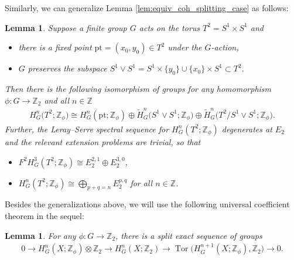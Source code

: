 \documentclass[pdftex]{sigma}
\newtheorem{lem}[thm]{Lemma}
\theoremstyle{definition}
\newcommand{\Z}{\mathbb{Z}}
\newcommand{\pt}{\mathrm{pt}}
\begin{document}
Similarly, we can generalize Lemma \ref{lem:equiv_coh_splitting_case} as follows:

\begin{lem} \label{lem:twisted_equiv_coh_splitting_case}
Suppose a finite group $G$ acts on the torus $T^2 = S^1 \times S^1$ and
\begin{itemize}\itemsep=0pt
\item there is a fixed point $\pt = (x_0, y_0) \in T^2$ under the $G$-action,

\item $G$ preserves the subspace $S^1 \vee S^1 = S^1 \times \{ y_0 \} \cup \{ x_0 \} \times S^1 \subset T^2$.
\end{itemize}
Then there is the following isomorphism of groups for any homomorphism $\phi \colon G \to \Z_2$ and all $n \in \Z$
\begin{gather*}
H^n_G\big(T^2; \Z_\phi\big) \cong H^n_G(\pt; \Z_\phi) \oplus \tilde{H}^n_G\big(S^1 \vee S^1; \Z_\phi\big) \oplus \tilde{H}^n_G\big(T^2/S^1 \vee S^1; \Z_\phi\big).
\end{gather*}
Further, the Leray--Serre spectral sequence for $H^n_G(T^2; \Z_\phi)$ degenerates at $E_2$ and the relevant extension problems are trivial, so that
\begin{itemize}\itemsep=0pt
\item[$(a)$]
$F^2H^3_G(T^2; \Z_\phi) \cong E_2^{2, 1} \oplus E_2^{3, 0}$,

\item[$(b)$]
$H^n_G(T^2; \Z_\phi) \cong \bigoplus_{p + q = n} E_2^{p, q}$ for all $n \in \Z$.
\end{itemize}
\end{lem}

Besides the generalizations above, we will use the following universal coef\/f\/icient theorem in the sequel:

\begin{lem} \label{lem:Z2_coefficient}
For any $\phi \colon G \to \Z_2$, there is a split exact sequence of groups
\begin{gather*}
0 \to H^n_G(X; \Z_\phi) \otimes \Z_2 \to H^n_G(X; \Z_2) \to \operatorname{Tor}\big(H^{n+1}_G(X; \Z_\phi), \Z_2\big) \to 0.
\end{gather*}
\end{lem}
\end{document}
